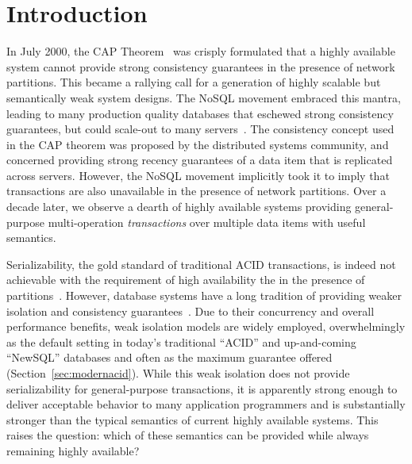 

\section{Introduction}

In July 2000, the CAP Theorem~\cite{gilbert-cap} was crisply
formulated that a highly available system cannot provide strong
consistency guarantees in the presence of network partitions. This
became a rallying call for a generation of highly scalable but
semantically weak system designs. The NoSQL movement embraced this
mantra, leading to many production quality databases that eschewed
strong consistency guarantees, but could scale-out to many
servers~\cite{bigtable, pnuts, dynamo}. The consistency concept used
in the CAP theorem was proposed by the distributed systems community,
and concerned providing strong recency guarantees of a data item that
is replicated across servers.  However, the NoSQL movement implicitly
took it to imply that transactions are also unavailable in the
presence of network partitions. Over a decade later, we observe a
dearth of highly available systems providing general-purpose
multi-operation \textit{transactions} over multiple data items with
useful semantics.


 Serializability, the gold standard of traditional ACID transactions,
 is indeed not achievable with the requirement of high availability
 the in the presence of partitions~\cite{davidson-survey}. However,
 database systems have a long tradition of providing weaker isolation
 and consistency guarantees~\cite{adya, ansicritique,
   gray-isolation}. Due to their concurrency and overall performance
 benefits, weak isolation models are widely employed, overwhelmingly
 as the default setting in today's traditional ``ACID'' and
 up-and-coming ``NewSQL'' databases and often as the maximum guarantee
 offered (Section~\ref{sec:modernacid}). While this weak isolation
 does not provide serializability for general-purpose transactions, it
 is apparently strong enough to deliver acceptable behavior to many
 application programmers and is substantially stronger than the
 typical semantics of current highly available systems. This raises
 the question: which of these semantics can be provided while always
 remaining highly available?

